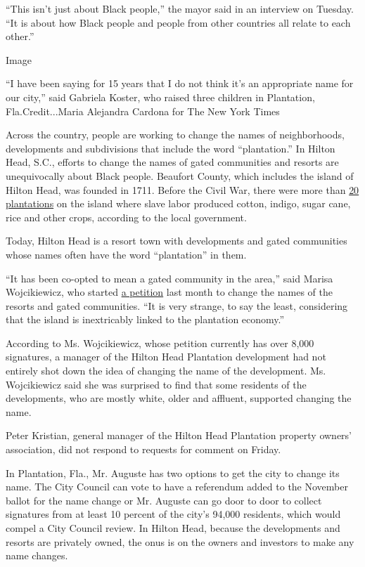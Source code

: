 ``This isn't just about Black people,'' the mayor said in an interview
on Tuesday. ``It is about how Black people and people from other
countries all relate to each other.''

Image

``I have been saying for 15 years that I do not think it's an
appropriate name for our city,'' said Gabriela Koster, who raised three
children in Plantation, Fla.Credit...Maria Alejandra Cardona for The New
York Times

Across the country, people are working to change the names of
neighborhoods, developments and subdivisions that include the word
``plantation.'' In Hilton Head, S.C., efforts to change the names of
gated communities and resorts are unequivocally about Black people.
Beaufort County, which includes the island of Hilton Head, was founded
in 1711. Before the Civil War, there were more than
\href{https://www.hiltonheadislandsc.gov/ourisland/history.cfm}{20
plantations} on the island where slave labor produced cotton, indigo,
sugar cane, rice and other crops, according to the local government.

Today, Hilton Head is a resort town with developments and gated
communities whose names often have the word ``plantation'' in them.

``It has been co-opted to mean a gated community in the area,'' said
Marisa Wojcikiewicz, who started
\href{https://www.change.org/p/beaufort-county-s-gated-communities-should-not-be-called-plantations?utm_source=share_petition\&utm_medium=custom_url\&recruited_by_id=7ef37120-b81e-0130-02cd-002219670981}{a
petition} last month to change the names of the resorts and gated
communities. ``It is very strange, to say the least, considering that
the island is inextricably linked to the plantation economy.''

According to Ms. Wojcikiewicz, whose petition currently has over 8,000
signatures, a manager of the Hilton Head Plantation development had not
entirely shot down the idea of changing the name of the development. Ms.
Wojcikiewicz said she was surprised to find that some residents of the
developments, who are mostly white, older and affluent, supported
changing the name.

Peter Kristian, general manager of the Hilton Head Plantation property
owners' association, did not respond to requests for comment on Friday.

In Plantation, Fla., Mr. Auguste has two options to get the city to
change its name. The City Council can vote to have a referendum added to
the November ballot for the name change or Mr. Auguste can go door to
door to collect signatures from at least 10 percent of the city's 94,000
residents, which would compel a City Council review. In Hilton Head,
because the developments and resorts are privately owned, the onus is on
the owners and investors to make any name changes.

